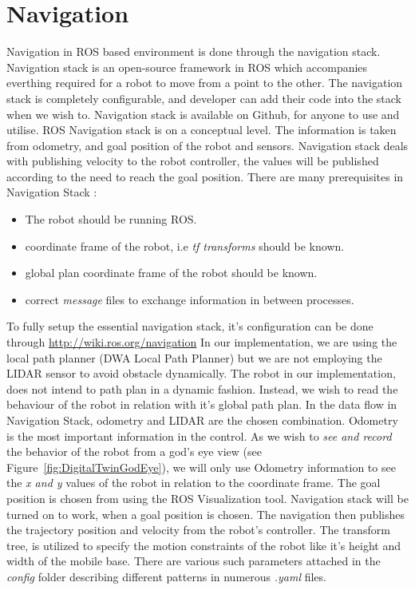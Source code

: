 \section{Navigation}
Navigation in ROS based environment is done through the navigation stack. Navigation stack is an open-source framework in ROS which accompanies everthing 
required for a robot to move from a point to the other. The navigation stack is completely configurable, and developer can add 
their code into the stack when we wish to. Navigation stack is available on Github, for anyone to use and utilise. 
ROS Navigation stack is on a conceptual level. The information is taken from odometry, and goal position of the robot and sensors. 
Navigation stack deals with publishing velocity to the robot controller, the values will be published
according to the need to reach the goal position. There are many prerequisites in Navigation Stack : 
\begin{itemize}
    \item The robot should be running ROS.
    \item coordinate frame of the robot, i.e \textit{tf transforms} should be known.
    \item global plan coordinate frame of the robot should be known.
    \item correct \textit{message} files to exchange information in between processes.
\end{itemize}
To fully setup the essential navigation stack, it's configuration can be done through \url{http://wiki.ros.org/navigation}
In our implementation, we are using the local path planner (DWA Local Path Planner) but we are not employing the LIDAR sensor to avoid obstacle dynamically.
The robot in our implementation, does not intend to path plan in a dynamic fashion. Instead, we wish to read the behaviour of the robot in relation with it's global path plan.
In the data flow in Navigation Stack, odometry and LIDAR are the chosen combination. Odometry is the most important information in the control.
As we wish to \textit{see and record} the behavior of the robot from a god's eye view (see Figure~\ref{fig:DigitalTwinGodEye}), we will only use Odometry information to
see the \textit{x and y} values of the robot in relation to the coordinate frame. The goal position is chosen from using the ROS Visualization tool.
Navigation stack will be turned on to work, when a goal position is chosen. The navigation then publishes the trajectory position and velocity from the 
robot's controller. The transform tree, is utilized to specify the motion constraints of the robot like it's height and width of the mobile base.
There are various such parameters attached in the \textit{config} folder describing different patterns in numerous \textit{.yaml} files.

